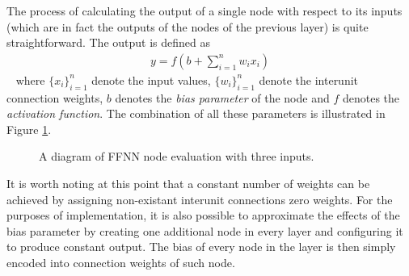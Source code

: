 The process of calculating the output of a single node with respect to its inputs (which are in fact the outputs of the nodes of the previous layer) is quite straightforward. The output is defined as
~
\begin{align}
	y = f\left(b+\sum_{i=1}^n w_i x_i\right)
\end{align}
~
where $\{x_i\}_{i=1}^n$ denote the input values, $\{w_i\}_{i=1}^n$ denote the interunit connection weights, $b$ denotes the \textit{bias parameter} of the node and $f$ denotes the \textit{activation function}. The combination of all these parameters is illustrated in Figure \ref{fig:neuron-combination}.

\begin{figure}[ht]
	\centering
	\scriptsize

	\caption[A diagram of FFNN node evaluation.]{A diagram of FFNN node evaluation with three inputs.}
	\label{fig:neuron-combination}
\end{figure}

It is worth noting at this point that a constant number of weights can be achieved by assigning non-existant interunit connections zero weights. For the purposes of implementation, it is also possible to approximate the effects of the bias parameter by creating one additional node in every layer and configuring it to produce constant output. The bias of every node in the layer is then simply encoded into connection weights of such node.
